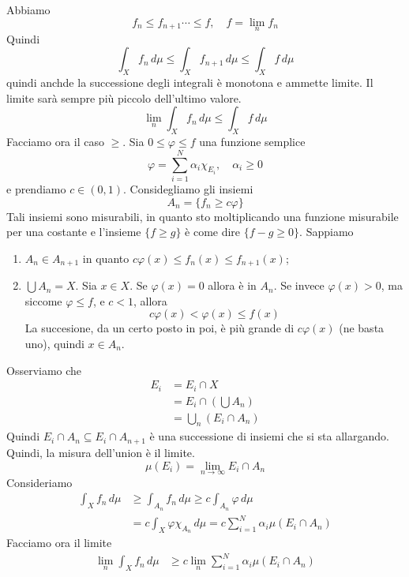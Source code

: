 \documentclass[a4paper]{article}
\begin{document}
\begin{snippetproof}{}
    Abbiamo
    \[
        f_n \leq f_{n+1} \cdots \leq f, \quad f = \lim_n f_n
    \]
    Quindi
    \[
        \int_X f_n \,d\mu \leq \int_X f_{n+1}\,d\mu \leq \int_X f\,d\mu
    \]
    quindi anchde la successione degli integrali è monotona e ammette limite.
    Il limite sarà sempre più piccolo dell'ultimo valore.
    \[
        \lim_n \int_X f_n\,d\mu \leq \int_X f\,d\mu
    \]
    Facciamo ora il caso \(\geq\). Sia \(0 \leq \varphi \leq f\) una funzione semplice
    \[
        \varphi = \sum_{i=1}^N \alpha_i \chi_{E_i}, \quad \alpha_i \geq 0
    \]
    e prendiamo \(c\in (0,1)\). Considegliamo gli insiemi
    \[
        A_n = \{f_n \geq c\varphi\}
    \]
    Tali insiemi sono misurabili, in quanto sto moltiplicando una funzione misurabile per una costante
    e l'insieme \(\{f\geq g\}\) è come dire \(\{f-g \geq 0\}\).
    Sappiamo 
    \begin{enumerate}
        \item \(A_n \in A_{n+1}\) in quanto \(c\varphi(x) \leq f_n(x) \leq f_{n+1}(x)\);
        \item \(\bigcup A_n = X\). Sia \(x\in X\). Se \(\varphi(x) = 0\) allora è in \(A_n\).
        Se invece \(\varphi(x) > 0\), ma siccome \(\varphi \leq f\), e \(c<1\), allora 
        \[
            c\varphi(x) < \varphi(x) \leq f(x)
        \]
        La succesione, da un certo posto in poi, è più grande di \(c\varphi(x)\) (ne basta uno),
        quindi \(x\in A_n\).
    \end{enumerate}
    Osserviamo che
    \begin{align*}
        E_i &= E_i \cap X \\
        &= E_i \cap (\bigcup A_n) \\
        &= \bigcup_n (E_i \cap A_n)
    \end{align*}
    Quindi \(E_i \cap A_n \subseteq E_i \cap A_{n+1}\) è una successione di insiemi che si sta allargando.
    Quindi, la misura dell'union è il limite.
    \[
        \mu(E_i) = \lim_{n\to\infty} E_i \cap A_n
    \]
    Consideriamo
    \begin{align*}
        \int_X f_n \, d\mu &\geq \int_{A_n} f_n \, d\mu \geq c \int_{A_n} \varphi \,d\mu \\
        &= c \int_X \varphi \chi_{A_n} \,d\mu = c\sum_{i=1}^N \alpha_i \mu(E_i \cap A_n)
    \end{align*}
    Facciamo ora il limite
    \begin{align*}
        \lim_n \int_X f_n \,d\mu &\geq c\lim_n \sum_{i=1}^N \alpha_i \mu(E_i \cap A_n) \\

\end{align*}
\end{snippetproof}
\end{document}

